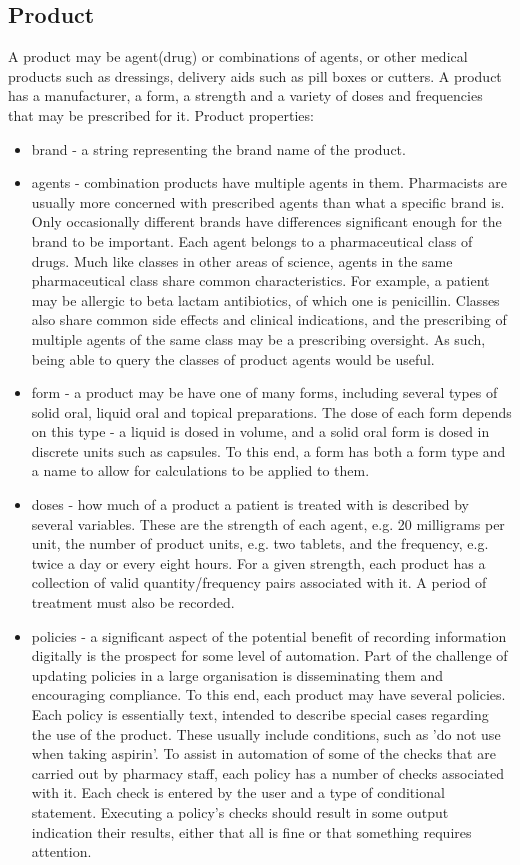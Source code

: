 \documentclass[letterpaper]{amsart}
\begin{document}
\subsection{Product}
A product may be agent(drug) or combinations of agents, or other medical products such as dressings, delivery aids such as pill boxes or cutters.  
A product has a manufacturer, a form, a strength and a variety of doses and frequencies that may be prescribed for it. 
Product properties:
\begin{itemize}
    \item brand - a string representing the brand name of the product. 
    \item agents - combination products have multiple agents in them.  Pharmacists are usually more concerned with prescribed agents than what a specific brand is.  Only occasionally different brands have differences significant enough for the brand to be important. Each agent belongs to a pharmaceutical class of drugs. Much like classes in other areas of science, agents in the same pharmaceutical class share common characteristics.  For example, a patient may be allergic to beta lactam antibiotics, of which one is penicillin.
	Classes also share common side effects and clinical indications, and the prescribing of multiple agents of the same class may be a prescribing oversight.  As such, being able to query the classes of product agents would be useful.
    \item form - a product may be have one of many forms, including several types of solid oral, liquid oral and topical preparations.  The dose of each form depends on this type - a liquid is dosed in volume, and a solid oral form is dosed in discrete units such as capsules.  To this end, a form has both a form type and a name to allow for calculations to be applied to them. 
    \item doses - how much of a product a patient is treated with is described by several variables.  These are the strength of each agent, e.g. 20 milligrams per unit, the number of product units, e.g. two tablets, and the frequency, e.g. twice a day or every eight hours.
    For a given strength, each product has a collection of valid quantity/frequency pairs associated with it.  A period of treatment must also be recorded.
    \item policies - a significant aspect of the potential benefit of recording information digitally is the prospect for some level of automation.  Part of the challenge of updating policies in a large organisation is disseminating them and encouraging compliance.  To this end, each product may have several policies.  Each policy is essentially text, intended to describe special cases regarding the use of the product.  These usually include conditions, such as 'do not use when taking aspirin'.  To assist in automation of some of the checks that are carried out by pharmacy staff, each policy has a number of checks associated with it.  Each check is entered by the user and a type of conditional statement.  Executing a policy's checks should result in some output indication their results, either that all is fine or that something requires attention. 

\end{itemize}
\end{document}
